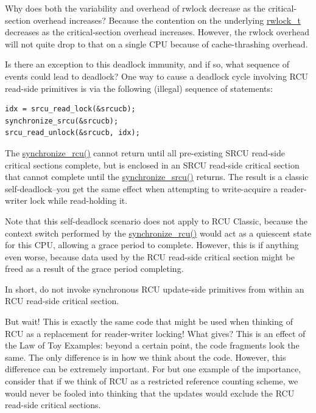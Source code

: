 \QuickQ{}
	Why does both the variability and overhead of rwlock decrease as the
	critical-section overhead increases?
\QuickA{}
	Because the contention on the underlying
	\url{rwlock_t} decreases as the critical-section overhead
	increases.
	However, the rwlock overhead will not quite drop to that on a single
	CPU because of cache-thrashing overhead.

\QuickQ{}
	Is there an exception to this deadlock immunity, and if so,
	what sequence of events could lead to deadlock?
\QuickA{}
	One way to cause a deadlock cycle involving
	RCU read-side primitives is via the following (illegal) sequence
	of statements:

\vspace{5pt}
\begin{minipage}[t]{\columnwidth}
\small
\begin{verbatim}
idx = srcu_read_lock(&srcucb);
synchronize_srcu(&srcucb);
srcu_read_unlock(&srcucb, idx);
\end{verbatim}
\end{minipage}
\vspace{5pt}

	The \url{synchronize_rcu()} cannot return until all
	pre-existing SRCU read-side critical sections complete, but
	is enclosed in an SRCU read-side critical section that cannot
	complete until the \url{synchronize_srcu()} returns.
	The result is a classic self-deadlock--you get the same
	effect when attempting to write-acquire a reader-writer lock
	while read-holding it.

	Note that this self-deadlock scenario does not apply to
	RCU Classic, because the context switch performed by the
	\url{synchronize_rcu()} would act as a quiescent state
	for this CPU, allowing a grace period to complete.
	However, this is if anything even worse, because data used
	by the RCU read-side critical section might be freed as a
	result of the grace period completing.

	In short, do not invoke synchronous RCU update-side primitives
	from within an RCU read-side critical section.

\QuickQ{}
	But wait!
	This is exactly the same code that might be used when thinking
	of RCU as a replacement for reader-writer locking!
	What gives?
\QuickA{}
	This is an effect of the Law of Toy Examples:
	beyond a certain point, the code fragments look the same.
	The only difference is in how we think about the code.
	However, this difference can be extremely important.
	For but one example of the importance, consider that if we think
	of RCU as a restricted reference counting scheme, we would never
	be fooled into thinking that the updates would exclude the RCU
	read-side critical sections.

